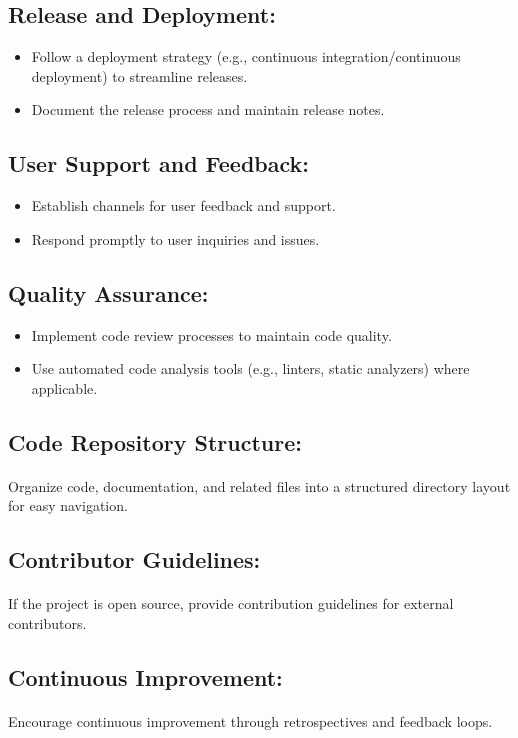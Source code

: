 \documentclass{article}
\begin{document}
\subsection{Release and Deployment:}
\begin{itemize}
    \item Follow a deployment strategy (e.g., continuous integration/continuous
        deployment) to streamline releases.
    \item Document the release process and maintain release notes.
\end{itemize}

\subsection{User Support and Feedback:}
\begin{itemize}
    \item Establish channels for user feedback and support.
    \item Respond promptly to user inquiries and issues.
\end{itemize}

\subsection{Quality Assurance:}
\begin{itemize}
    \item Implement code review processes to maintain code quality.
    \item Use automated code analysis tools (e.g., linters, static analyzers) where applicable.
\end{itemize}

\subsection{Code Repository Structure:}
\paragraph{}
Organize code, documentation, and related files into a structured directory layout for easy navigation.

\subsection{Contributor Guidelines:}
\paragraph{}
If the project is open source, provide contribution guidelines for external contributors.

\subsection{Continuous Improvement:}
\paragraph{}
Encourage continuous improvement through retrospectives and feedback loops.
\end{document}
